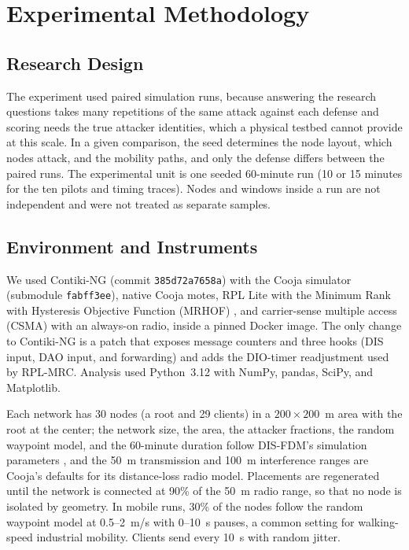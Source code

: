 \section{Experimental Methodology}\label{sec:setup}
\subsection{Research Design}
The experiment used paired simulation runs, because answering the research questions takes many repetitions of the same attack against each defense and scoring needs the true attacker identities, which a physical testbed cannot provide at this scale. In a given comparison, the seed determines the node layout, which nodes attack, and the mobility paths, and only the defense differs between the paired runs. The experimental unit is one seeded 60-minute run (10 or 15 minutes for the ten pilots and timing traces). Nodes and windows inside a run are not independent and were not treated as separate samples.

\subsection{Environment and Instruments}
We used Contiki-NG \cite{contiking2022} (commit \texttt{385d72a7658a}) with the Cooja simulator \cite{cooja2006} (submodule \texttt{fabff3ee}), native Cooja motes, RPL Lite with the Minimum Rank with Hysteresis Objective Function (MRHOF) \cite{rfc6719}, and carrier-sense multiple access (CSMA) with an always-on radio, inside a pinned Docker image. The only change to Contiki-NG is a patch that exposes message counters and three hooks (DIS input, DAO input, and forwarding) and adds the DIO-timer readjustment used by RPL-MRC. Analysis used Python~3.12 with NumPy, pandas, SciPy, and Matplotlib.

Each network has 30 nodes (a root and 29 clients) in a $200\times200$~m area with the root at the center; the network size, the area, the attacker fractions, the random waypoint model, and the 60-minute duration follow DIS-FDM's simulation parameters \cite{prajisha2025}, and the 50~m transmission and 100~m interference ranges are Cooja's defaults for its distance-loss radio model. Placements are regenerated until the network is connected at 90\% of the 50~m radio range, so that no node is isolated by geometry. In mobile runs, 30\% of the nodes follow the random waypoint model \cite{camp2002} at 0.5--2~m/s with 0--10~s pauses, a common setting for walking-speed industrial mobility. Clients send every 10~s with random jitter.

